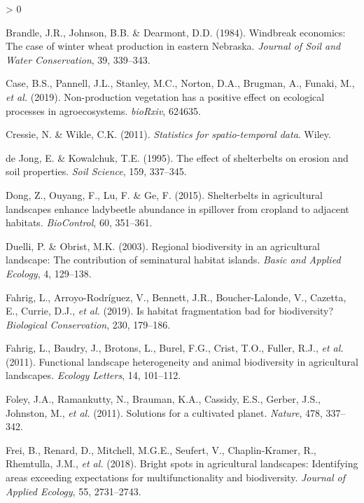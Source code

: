 \documentclass[]{elsarticle} %
\newlength{\cslhangindent}
\newenvironment{CSLReferences}[2] %
 {%
  \setlength{\parindent}{0pt}
  \ifodd #1 \everypar{\setlength{\hangindent}{\cslhangindent}}\ignorespaces\fi
  \ifnum #2 > 0
  \setlength{\parskip}{#2\baselineskip}
  \fi
 }%
 {}
\begin{document}
\begin{CSLReferences}{1}{0}
\leavevmode\hypertarget{ref-brandle1984}{}%
Brandle, J.R., Johnson, B.B. \& Dearmont, D.D. (1984). Windbreak economics: The case of winter wheat production in eastern {Nebraska}. \emph{Journal of Soil and Water Conservation}, 39, 339--343.

\leavevmode\hypertarget{ref-case2019}{}%
Case, B.S., Pannell, J.L., Stanley, M.C., Norton, D.A., Brugman, A., Funaki, M., \emph{et al.} (2019). Non-production vegetation has a positive effect on ecological processes in agroecosystems. \emph{bioRxiv}, 624635.

\leavevmode\hypertarget{ref-cressie2011}{}%
Cressie, N. \& Wikle, C.K. (2011). \emph{Statistics for spatio-temporal data}. Wiley.

\leavevmode\hypertarget{ref-deJong1995}{}%
de Jong, E. \& Kowalchuk, T.E. (1995). The effect of shelterbelts on erosion and soil properties. \emph{Soil Science}, 159, 337--345.

\leavevmode\hypertarget{ref-dong2015}{}%
Dong, Z., Ouyang, F., Lu, F. \& Ge, F. (2015). Shelterbelts in agricultural landscapes enhance ladybeetle abundance in spillover from cropland to adjacent habitats. \emph{BioControl}, 60, 351--361.

\leavevmode\hypertarget{ref-duelli2003}{}%
Duelli, P. \& Obrist, M.K. (2003). Regional biodiversity in an agricultural landscape: The contribution of seminatural habitat islands. \emph{Basic and Applied Ecology}, 4, 129--138.

\leavevmode\hypertarget{ref-fahrig2019}{}%
Fahrig, L., Arroyo-Rodríguez, V., Bennett, J.R., Boucher-Lalonde, V., Cazetta, E., Currie, D.J., \emph{et al.} (2019). Is habitat fragmentation bad for biodiversity? \emph{Biological Conservation}, 230, 179--186.

\leavevmode\hypertarget{ref-fahrig2011}{}%
Fahrig, L., Baudry, J., Brotons, L., Burel, F.G., Crist, T.O., Fuller, R.J., \emph{et al.} (2011). Functional landscape heterogeneity and animal biodiversity in agricultural landscapes. \emph{Ecology Letters}, 14, 101--112.

\leavevmode\hypertarget{ref-foley2011}{}%
Foley, J.A., Ramankutty, N., Brauman, K.A., Cassidy, E.S., Gerber, J.S., Johnston, M., \emph{et al.} (2011). Solutions for a cultivated planet. \emph{Nature}, 478, 337--342.

\leavevmode\hypertarget{ref-frei2018}{}%
Frei, B., Renard, D., Mitchell, M.G.E., Seufert, V., Chaplin-Kramer, R., Rhemtulla, J.M., \emph{et al.} (2018). Bright spots in agricultural landscapes: Identifying areas exceeding expectations for multifunctionality and biodiversity. \emph{Journal of Applied Ecology}, 55, 2731--2743.


\end{CSLReferences}
\end{document}
